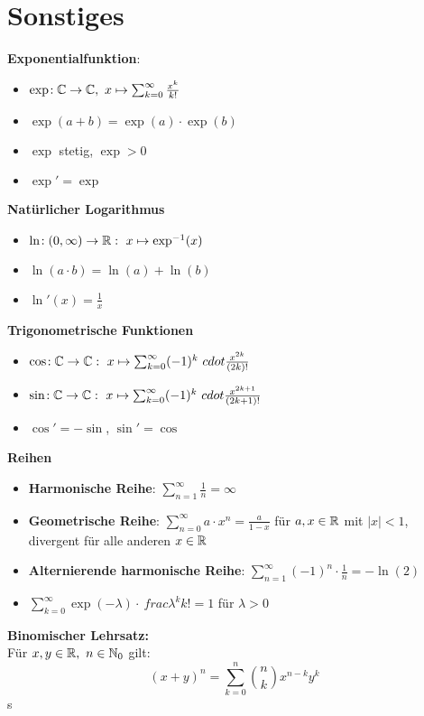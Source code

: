 \section{Sonstiges}

\textbf{Exponentialfunktion}:
\begin{itemize}
\item $\exp\!: \mathbb{C}\to\mathbb{C},\ x \mapsto \sum_{k=0}^\infty \frac{x^k}{k!}$

\item $\exp(a + b) = \exp(a) \cdot \exp(b)$

\item $\exp$ stetig, $\exp > 0$

\item $\exp' = \exp$
\end{itemize}

\textbf{Natürlicher Logarithmus}
\begin{itemize}
\item $\ln\!: (0,\infty)\to\mathbb{R}:\ x \mapsto \exp^{-1}(x)$

\item $\ln(a \cdot b) = \ln(a) + \ln(b)$

\item $\ln'(x) = \frac{1}{x}$
\end{itemize}

\textbf{Trigonometrische Funktionen}
\begin{itemize}
\item $\cos\!: \mathbb{C}\to\mathbb{C}:\ x \mapsto \sum_{k=0}^\infty (-1)^k\ cdot \frac{x^{2k}}{(2k)!}$

\item $\sin\!: \mathbb{C}\to\mathbb{C}:\ x \mapsto \sum_{k=0}^\infty (-1)^k\ cdot \frac{x^{2k+1}}{(2k+1)!}$

\item $\cos' = -\sin$, $\sin' = \cos$
\end{itemize}

\textbf{Reihen}
\begin{itemize}
\item \textbf{Harmonische Reihe}: $\sum_{n=1}^\infty \frac{1}{n} = \infty$

\item \textbf{Geometrische Reihe}:
  $\sum_{n=0}^\infty a \cdot x^n = \frac{a}{1-x}$
  für $a,x\in\mathbb{R}$ mit $|x| < 1$, divergent für alle anderen $x\in\mathbb{R}$

\item \textbf{Alternierende harmonische Reihe}:
$\sum_{n=1}^\infty (-1)^n \cdot \frac{1}{n} = -\ln(2)$

\item $\sum_{k=0}^\infty \exp(-\lambda) \cdot\ frac{\lambda^k}{k!} = 1$
  für $\lambda > 0$
\end{itemize}

\textbf{Binomischer Lehrsatz:}\\
Für $x,y\in\mathbb{R},\ n\in\mathbb{N}_0$ gilt:
\[
  (x+y)^n=\sum_{k=0}^n\binom{n}{k}x^{n-k}y^k
\]
s